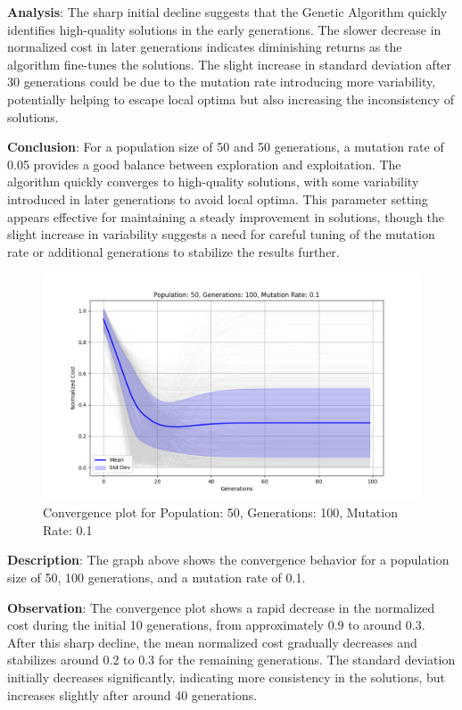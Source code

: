 \documentclass[
]{article}
\begin{document}
    \textbf{Analysis}: The sharp initial decline suggests that the Genetic Algorithm quickly identifies high-quality solutions in the early generations. The slower decrease in normalized cost in later generations indicates diminishing returns as the algorithm fine-tunes the solutions. The slight increase in standard deviation after 30 generations could be due to the mutation rate introducing more variability, potentially helping to escape local optima but also increasing the inconsistency of solutions.

    \textbf{Conclusion}: For a population size of 50 and 50 generations, a mutation rate of 0.05 provides a good balance between exploration and exploitation. The algorithm quickly converges to high-quality solutions, with some variability introduced in later generations to avoid local optima. This parameter setting appears effective for maintaining a steady improvement in solutions, though the slight increase in variability suggests a need for careful tuning of the mutation rate or additional generations to stabilize the results further.

    \begin{figure}[H]
        \centering
        \includegraphics[width=\textwidth]{genetic_algorithm/Population_50_Generations_100_MutationRate_0.1}
        \caption{Convergence plot for Population: 50, Generations: 100, Mutation Rate: 0.1}
        \label{fig:ga_50_100_1}
    \end{figure}

    \textbf{Description}: The graph above shows the convergence behavior for a population size of 50, 100 generations, and a mutation rate of 0.1.

    \textbf{Observation}: The convergence plot shows a rapid decrease in the normalized cost during the initial 10 generations, from approximately 0.9 to around 0.3. After this sharp decline, the mean normalized cost gradually decreases and stabilizes around 0.2 to 0.3 for the remaining generations. The standard deviation initially decreases significantly, indicating more consistency in the solutions, but increases slightly after around 40 generations.
\end{document}
